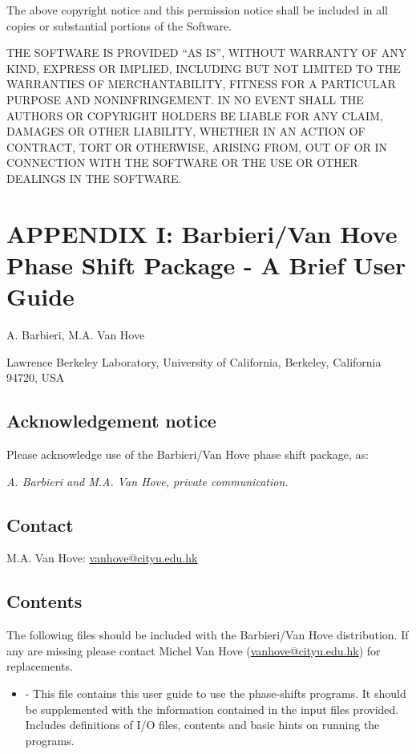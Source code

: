 \documentclass[letterpaper,10pt,english]{sphinxmanual}
\begin{document}
The above copyright notice and this permission notice shall be included in
all copies or substantial portions of the Software.

THE SOFTWARE IS PROVIDED ``AS IS'', WITHOUT WARRANTY OF ANY KIND, EXPRESS OR
IMPLIED, INCLUDING BUT NOT LIMITED TO THE WARRANTIES OF MERCHANTABILITY,
FITNESS FOR A PARTICULAR PURPOSE AND NONINFRINGEMENT. IN NO EVENT SHALL THE
AUTHORS OR COPYRIGHT HOLDERS BE LIABLE FOR ANY CLAIM, DAMAGES OR OTHER
LIABILITY, WHETHER IN AN ACTION OF CONTRACT, TORT OR OTHERWISE, ARISING FROM,
OUT OF OR IN CONNECTION WITH THE SOFTWARE OR THE USE OR OTHER DEALINGS IN
THE SOFTWARE.


\chapter{APPENDIX I: Barbieri/Van Hove Phase Shift Package - A Brief User Guide}
\label{phshift2007:appendix-i-barbieri-van-hove-phase-shift-package-a-brief-user-guide}\label{phshift2007::doc}
A. Barbieri, M.A. Van Hove

Lawrence Berkeley Laboratory,
University of California,
Berkeley,
California 94720, USA


\section{Acknowledgement notice}
\label{phshift2007:acknowledgement-notice}
Please acknowledge use of the Barbieri/Van Hove
phase shift package, as:

\emph{A. Barbieri and M.A. Van Hove, private communication.}


\section{Contact}
\label{phshift2007:contact}
M.A. Van Hove:  \href{mailto:vanhove@cityu.edu.hk}{vanhove@cityu.edu.hk}


\section{Contents}
\label{phshift2007:contents}
The following files should be included with the Barbieri/Van Hove
distribution. If any are missing please contact Michel Van Hove
(\href{mailto:vanhove@cityu.edu.hk}{vanhove@cityu.edu.hk}) for replacements.
\begin{itemize}
\item {} 
 - This file contains this user guide
to use the phase-shifts programs. It should be
supplemented with the information contained in
the input files provided. Includes definitions of I/O files,
contents and basic hints on running the programs.

\end{itemize}
\end{document}
